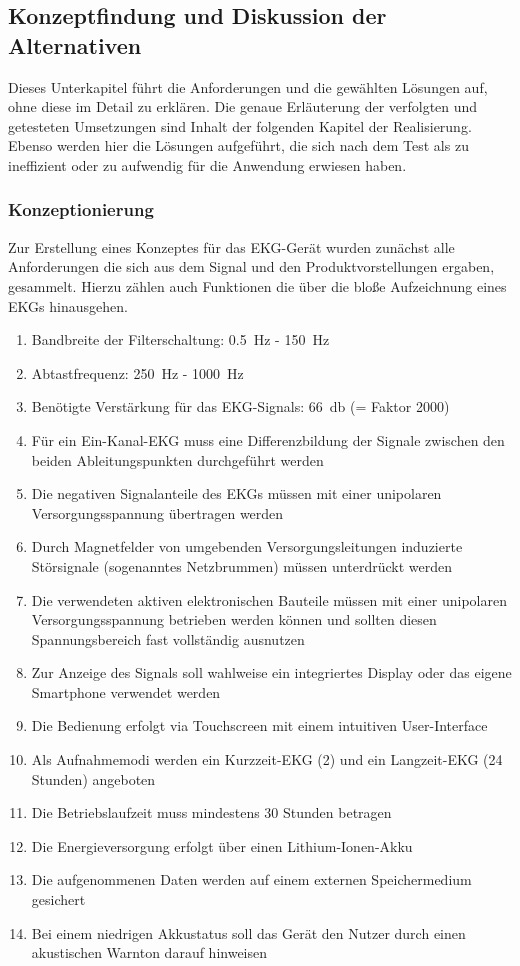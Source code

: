 
\subsection{Konzeptfindung und Diskussion der Alternativen}

Dieses Unterkapitel führt die Anforderungen und die gewählten Lösungen auf, ohne diese im Detail zu erklären. Die genaue Erläuterung der verfolgten und getesteten Umsetzungen sind Inhalt der folgenden Kapitel der Realisierung. Ebenso werden hier die Lösungen aufgeführt, die sich nach dem Test als zu ineffizient oder zu aufwendig für die Anwendung erwiesen haben.

\subsubsection{Konzeptionierung}

Zur Erstellung eines Konzeptes für das EKG-Gerät wurden zunächst alle Anforderungen die sich aus dem Signal und den Produktvorstellungen ergaben, gesammelt. Hierzu zählen auch Funktionen die über die bloße Aufzeichnung eines EKGs hinausgehen.

\begin{enumerate}
\item Bandbreite der Filterschaltung: \SI{0.5}{\hertz} - \SI{150}{\hertz}
\item Abtastfrequenz: \SI{250}{\hertz} - \SI{1000}{\hertz}
\item Benötigte Verstärkung für das EKG-Signals: \SI{66}{\decibel} (= Faktor 2000)
\item Für ein Ein-Kanal-EKG muss eine Differenzbildung der Signale zwischen den beiden Ableitungspunkten durchgeführt werden
\item Die negativen Signalanteile des EKGs müssen mit einer unipolaren Versorgungsspannung übertragen werden
\item Durch Magnetfelder von umgebenden Versorgungsleitungen induzierte Störsignale (sogenanntes Netzbrummen) müssen unterdrückt werden
\item Die verwendeten aktiven elektronischen Bauteile müssen mit einer unipolaren Versorgungsspannung betrieben werden können und sollten diesen Spannungsbereich fast vollständig ausnutzen
\item Zur Anzeige des Signals soll wahlweise ein integriertes Display oder das eigene Smartphone verwendet werden
\item Die Bedienung erfolgt via Touchscreen mit einem intuitiven User-Interface
\item Als Aufnahmemodi werden ein Kurzzeit-EKG (\SI{2}{\min}) und ein Langzeit-EKG (24 Stunden) angeboten
\item Die Betriebslaufzeit muss mindestens 30 Stunden betragen
\item Die Energieversorgung erfolgt über einen Lithium-Ionen-Akku
\item Die aufgenommenen Daten werden auf einem externen Speichermedium gesichert
\item Bei einem niedrigen Akkustatus soll das Gerät den Nutzer durch einen akustischen Warnton darauf hinweisen
\end{enumerate}

